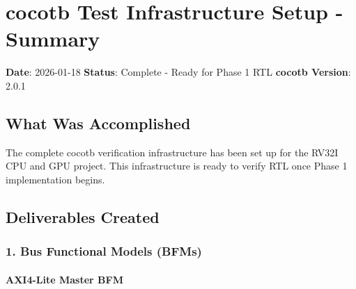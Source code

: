 \section{cocotb Test Infrastructure Setup - Summary}\label{cr:app:archive-cocotb-setup-summary}

\begin{record}

\textbf{Date}: 2026-01-18 \textbf{Status}: \ok{} Complete - Ready for
Phase 1 RTL \textbf{cocotb Version}: 2.0.1

\end{record}

\subsection{What Was Accomplished}\label{cr:app:archive-cocotb-setup-summary:what-was-accomplished}

\begin{record}

The complete cocotb verification infrastructure has been set up for the
RV32I CPU and GPU project. This infrastructure is ready to verify RTL
once Phase 1 implementation begins.

\end{record}

\subsection{Deliverables Created}\label{cr:app:archive-cocotb-setup-summary:deliverables-created}

\subsubsection{1. Bus Functional Models (BFMs)}\label{cr:app:archive-cocotb-setup-summary:1-bus-functional-models-bfms}

\paragraph{AXI4-Lite Master BFM}\label{cr:app:archive-cocotb-setup-summary:axi4-lite-master-bfm}

